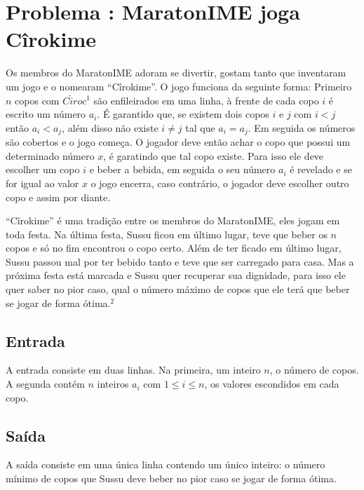 \section*{Problema \proxLetra: MaratonIME joga Cîrokime}

Os membros do MaratonIME adoram se divertir, gostam tanto que inventaram um jogo e o nomearam ``Cîrokime''. O jogo funciona da seguinte forma:\newline 
Primeiro $n$ copos com $C\hat{i}roc^1$ são enfileirados em uma linha, à frente de cada copo $i$ é escrito um número $a_i$. É garantido que, se existem dois copos $i$ e $j$ com $i < j$ então $a_i < a_j$, além disso não existe $i \neq j$ tal que $a_i = a_j$. Em seguida os números são cobertos e o jogo começa.
O jogador deve então achar o copo que possui um determinado número $x$, é garatindo que tal copo existe. Para isso ele deve escolher um copo $i$ e beber a bebida, em seguida o seu número $a_i$ é revelado e se for igual ao valor $x$ o jogo encerra, caso contrário, o jogador deve escolher outro copo e assim por diante. 

``Cîrokime'' é uma tradição entre os membros do MaratonIME, eles jogam em toda festa. Na última festa, Sussu ficou em último lugar, teve que beber os $n$ copos e só no fim encontrou o copo certo. Além de ter ficado em último lugar, Sussu passou mal por ter bebido tanto e teve que ser carregado para casa. Mas a próxima festa está marcada e Sussu quer recuperar sua dignidade, para isso ele quer saber no pior caso, qual o número máximo de copos que ele terá que beber se jogar de forma ótima.$^2$

\subsection*{Entrada}
\textoDiversasInstanciasEOF

A entrada consiste em duas linhas. Na primeira, um inteiro $n$, o número de copos. A segunda contém $n$ inteiros $a_i$ com $1 \leq i \leq n$, os valores escondidos em cada copo.


\subsection*{Saída}

A saída consiste em uma única linha contendo um único inteiro: o número mínimo de copos que Sussu deve beber no pior caso se jogar de forma ótima.


